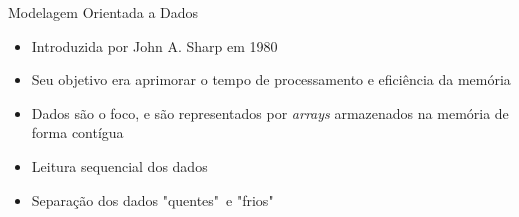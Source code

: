 \documentclass{beamer}
\begin{document}
\frame{\tableofcontents[currentsection]}


\begin{frame}[t]{Modelagem Orientada a Dados}
    \begin{itemize}
        \item Introduzida por John A. Sharp em 1980
        \item Seu objetivo era aprimorar o tempo de processamento e eficiência da 
            memória
        \item Dados são o foco, e são representados por \textit{arrays} armazenados na 
            memória de forma contígua
        \item Leitura sequencial dos dados
        \item Separação dos dados "quentes"\ e "frios"
    \end{itemize}
\end{frame}
\end{document}
